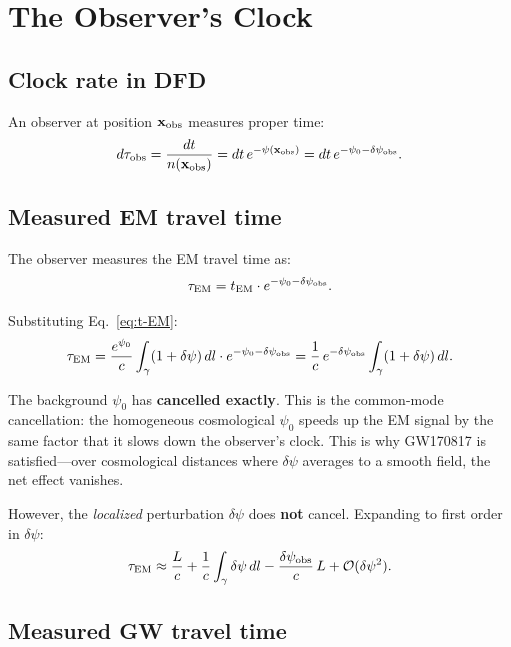 \documentclass[11pt]{article}
\begin{document}
\section{The Observer's Clock}

\subsection{Clock rate in DFD}

An observer at position $\mathbf{x}_{\rm obs}$ measures proper time:
\begin{equation}
d\tau_{\rm obs} = \frac{dt}{n(\mathbf{x}_{\rm obs})}
= dt\,e^{-\psi(\mathbf{x}_{\rm obs})}
= dt\,e^{-\psi_0 - \delta\psi_{\rm obs}}.
\end{equation}

\subsection{Measured EM travel time}

The observer measures the EM travel time as:
\begin{equation}
\tau_{\rm EM} = t_{\rm EM} \cdot e^{-\psi_0 - \delta\psi_{\rm obs}}.
\end{equation}

Substituting Eq.~\eqref{eq:t-EM}:
\begin{equation}
\tau_{\rm EM} = \frac{e^{\psi_0}}{c}\int_\gamma (1 + \delta\psi)\,dl
\cdot e^{-\psi_0 - \delta\psi_{\rm obs}}
= \frac{1}{c}\,e^{-\delta\psi_{\rm obs}}
\int_\gamma (1 + \delta\psi)\,dl.
\end{equation}

The background $\psi_0$ has \textbf{cancelled exactly}. This is the
common-mode cancellation: the homogeneous cosmological $\psi_0$
speeds up the EM signal by the same factor that it slows down the
observer's clock. This is why GW170817 is satisfied---over cosmological
distances where $\delta\psi$ averages to a smooth field, the net
effect vanishes.

However, the \emph{localized} perturbation $\delta\psi$ does
\textbf{not} cancel. Expanding to first order in $\delta\psi$:
\begin{equation}\label{eq:tau-EM-final}
\tau_{\rm EM} \approx \frac{L}{c} + \frac{1}{c}\int_\gamma
\delta\psi\,dl - \frac{\delta\psi_{\rm obs}}{c}\,L
+ \mathcal{O}(\delta\psi^2).
\end{equation}

\subsection{Measured GW travel time}
\end{document}
